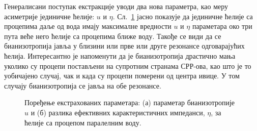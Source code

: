 Генералисани поступак екстракције уводи два нова параметра, као меру асиметрије јединичне ћелије: $u$ и $\eta$. Сл.~\ref{fig12} јасно показује да јединичне ћелије са процепима даље од вода имају максималне вредности $u$ и $\eta$ параметара око три пута веће него ћелије са процепима ближе воду. Такође се види да се бианизотропија јавља у близини или прве или друге резонансе одговарајућих ћелија. Интересантно је напоменути да је бианизотропија драстично мања уколико су процепи постављени на супротним странама СРР-ова, као што је то уобичајено случај, чак и када су процепи померени од центра ивице. У том случају бианизотропија се јавља на обе резонансе.
\begin{figure}[!t]
\centering
{}\hfill
{}
\caption{Поређење екстрахованих параметара: (а) параметар бианизотропије $u$ и (б) разлика ефективних карактеристичних импеданси, $\eta$, за ћелије са процепом паралелним воду.}
\label{fig12}
\end{figure} 

